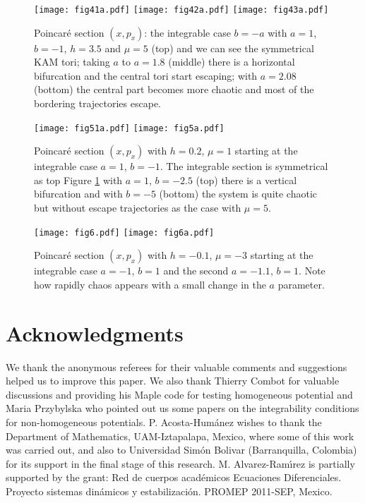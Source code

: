 \documentclass[final]{siamart0516}
\begin{document}
\begin{figure}
\begin{center}
\texttt{[image: fig41a.pdf]}
\texttt{[image: fig42a.pdf]}
\texttt{[image: fig43a.pdf]}
\end{center}
\caption{ Poincar\'e section $(x,p_x)$: the integrable case $b=-a$ with  $a=1$, $b=-1$, $h=3.5$ and  $\mu=5$ (top) and we can see the symmetrical KAM tori; taking $a$ to $a=1.8$ (middle) there is a horizontal bifurcation  and the central tori start escaping; with $a=2.08$ (bottom) the central part becomes more chaotic and most of the bordering  trajectories escape. }
\label{fig:4}      
\end{figure}

\begin{figure}
\begin{center}
\texttt{[image: fig51a.pdf]}
\texttt{[image: fig5a.pdf]}
\end{center}
\caption{Poincar\'e section $(x,p_x)$  with $h=0.2$,  $\mu=1$ starting at the integrable case $a=1$, $b=-1$. The integrable section is symmetrical as top Figure \ref{fig:4}   with $a=1$, $b=-2.5$ (top) there is a vertical bifurcation and  with $b=-5$ (bottom) the system is quite chaotic  but without escape trajectories as the case with $\mu=5$.}
\label{fig:5}      
\end{figure}

\begin{figure}
\begin{center}
\texttt{[image: fig6.pdf]}
\texttt{[image: fig6a.pdf]}
\end{center}
\caption{Poincar\'e section $(x,p_x)$  with $h=-0.1$,  $\mu=-3$ starting at the integrable case $a=-1$, $b=1$ and the second  $a=-1.1$, $b=1$. Note how rapidly chaos appears with a small change in the $a$ parameter.}
\label{fig:6}      
\end{figure}

\section*{Acknowledgments}
We thank the anonymous referees for their  valuable comments
and suggestions helped us to improve this  paper.
We also thank  Thierry Combot for valuable discussions and providing his Maple code 
for testing homogeneous  potential and Maria Przybylska  who pointed out  us some papers on the integrability conditions for non-homogeneous potentials.
P. Acosta-Hum\'anez wishes to thank the Department of Mathematics, UAM-Iztapalapa, Mexico, where some of this work was carried out, and also to Universidad Sim\'on Bolivar (Barranquilla, Colombia) for its support in the final stage of this research.  M. Alvarez-Ram\'{\i}rez  is partially supported by the grant: Red de cuerpos acad\'emicos Ecuaciones Diferenciales. Proyecto sistemas  din\'amicos y estabilizaci\'on. PROMEP 2011-SEP, Mexico.



\end{document}
